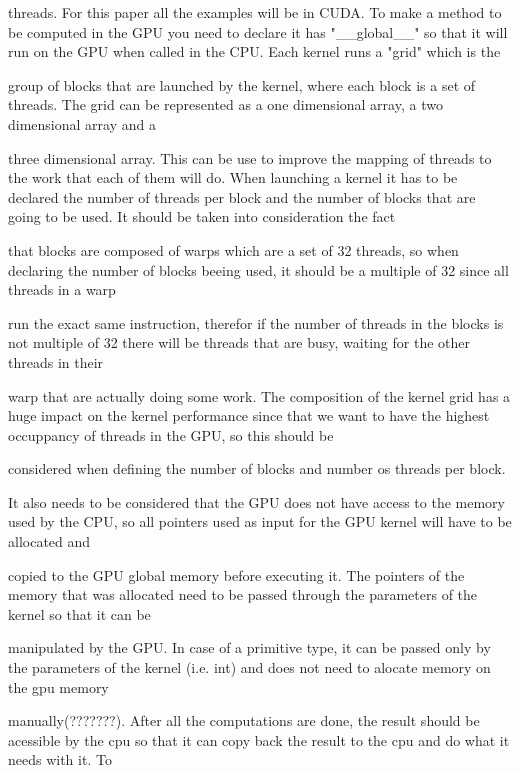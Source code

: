 \documentclass[runningheads]{llncs}
\begin{document}
threads.
\newline
For this paper all the examples will be in CUDA.
\newline
To make a method to be computed in the GPU you need to declare it has "__global__" so that it will run on the GPU when called in the CPU. Each kernel runs a "grid" which is the 

group of blocks that are launched by the kernel, where each block is a set of threads. The grid can be represented as a one dimensional array, a two dimensional array and a 

three dimensional array. This can be use to improve the mapping of threads to the work that each of them will do. 
\newline
When launching a kernel it has to be declared the number of threads per block and the number of blocks that are going to be used. It should be taken into consideration the fact 

that blocks are composed of warps which are a set of 32 threads, so when declaring the number of blocks beeing used, it should be a multiple of 32 since all threads in a warp 

run the exact same instruction, therefor if the number of threads in the blocks is not multiple of 32 there will be threads that are busy, waiting for the other threads in their 

warp that are actually doing some work.
\newline
The composition of the kernel grid has a huge impact on the kernel performance since that we want to have the highest occuppancy of threads in the GPU, so this should be 

considered when defining the number of blocks and number os threads per block.

\newline
It also needs to be considered that the GPU does not have access to the memory used by the CPU, so all pointers used as input for the GPU kernel will have to be allocated and 

copied to the GPU global memory before executing it. The pointers of the memory that was allocated need to be passed through the parameters of the kernel so that it can be 

manipulated by the GPU. In case of a primitive type, it can be passed only by the parameters of the kernel (i.e. int) and does not need to alocate memory on the gpu memory 

manually(???????). After all the computations are done, the result should be acessible by the cpu so that it can copy back the result to the cpu and do what it needs with it. To 
\end{document}
